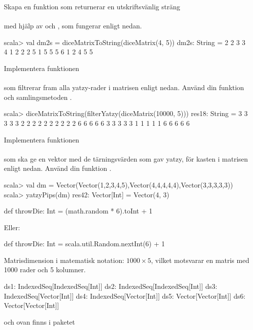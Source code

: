 \Subtask \label{matrices:subtask:diceMatrixToString} Skapa en funktion som returnerar en utskriftsvänlig sträng \\  \\med hjälp av  och , som fungerar enligt nedan.
\begin{REPL}
scala> val dm2s = diceMatrixToString(diceMatrix(4, 5))
dm2s: String =
2 2 3 3 4
1 2 2 2 5
1 5 5 5 6
1 2 4 5 5
\end{REPL}



\Subtask Implementera funktionen \\  \\ som filtrerar fram alla yatzy-rader i matrisen  enligt nedan. Använd din funktion  och samlingsmetoden .
\begin{REPL}
scala> diceMatrixToString(filterYatzy(diceMatrix(10000, 5)))
res18: String =
3 3 3 3 3
2 2 2 2 2
2 2 2 2 2
6 6 6 6 6
3 3 3 3 3
1 1 1 1 1
6 6 6 6 6
\end{REPL}



\Subtask Implementera funktionen \\
\\
som ska ge en vektor med de tärningsvärden som gav yatzy, för kasten i matrisen  enligt nedan. Använd din funktion .
\begin{REPL}
scala> val dm = Vector(Vector(1,2,3,4,5),Vector(4,4,4,4,4),Vector(3,3,3,3,3))
scala> yatzyPips(dm)
res42: Vector[Int] = Vector(4, 3)
\end{REPL}

\SOLUTION

\TaskSolved \what

\SubtaskSolved
\begin{Code}
def throwDie: Int = (math.random * 6).toInt + 1
\end{Code}
Eller:
\begin{Code}
def throwDie: Int = scala.util.Random.nextInt(6) + 1
\end{Code}

\SubtaskSolved  Matrisdimension i matematisk notation: $1000 \times 5$, vilket motsvarar en matris med 1000 rader och 5 kolumner.

\SubtaskSolved
\begin{Code}
ds1: IndexedSeq[IndexedSeq[Int]]
ds2: IndexedSeq[IndexedSeq[Int]]
ds3: IndexedSeq[Vector[Int]]
ds4: IndexedSeq[Vector[Int]]
ds5: Vector[Vector[Int]]
ds6: Vector[Vector[Int]]
\end{Code}
 och  ovan finns i paketet 

